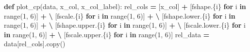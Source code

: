 \documentclass[
]{article}
\newenvironment{Shaded}{\begin{snugshade}}{\end{snugshade}}
\newcommand{\BuiltInTok}[1]{#1}
\newcommand{\ControlFlowTok}[1]{\textcolor[rgb]{0.13,0.29,0.53}{\textbf{#1}}}
\newcommand{\DecValTok}[1]{\textcolor[rgb]{0.00,0.00,0.81}{#1}}
\newcommand{\KeywordTok}[1]{\textcolor[rgb]{0.13,0.29,0.53}{\textbf{#1}}}
\newcommand{\NormalTok}[1]{#1}
\newcommand{\OperatorTok}[1]{\textcolor[rgb]{0.81,0.36,0.00}{\textbf{#1}}}
\newcommand{\SpecialCharTok}[1]{\textcolor[rgb]{0.00,0.00,0.00}{#1}}
\newcommand{\SpecialStringTok}[1]{\textcolor[rgb]{0.31,0.60,0.02}{#1}}
\theoremstyle{definition}
\theoremstyle{plain}
\theoremstyle{definition}
\theoremstyle{definition}
\theoremstyle{definition}
\theoremstyle{definition}
\theoremstyle{remark}
\begin{document}
\begin{Shaded}
\begin{Highlighting}[]
\KeywordTok{def}\NormalTok{ plot\_cp(data, x\_col, x\_col\_label):}
\NormalTok{  rel\_cols }\OperatorTok{=}\NormalTok{ [x\_col] }\OperatorTok{+}\NormalTok{ [}\SpecialStringTok{f\textquotesingle{}shape.}\SpecialCharTok{\{i\}}\SpecialStringTok{\textquotesingle{}} \ControlFlowTok{for}\NormalTok{ i }\KeywordTok{in} \BuiltInTok{range}\NormalTok{(}\DecValTok{1}\NormalTok{, }\DecValTok{6}\NormalTok{)] }\OperatorTok{+} \OperatorTok{\textbackslash{}}
\NormalTok{    [}\SpecialStringTok{f\textquotesingle{}scale.}\SpecialCharTok{\{i\}}\SpecialStringTok{\textquotesingle{}} \ControlFlowTok{for}\NormalTok{ i }\KeywordTok{in} \BuiltInTok{range}\NormalTok{(}\DecValTok{1}\NormalTok{, }\DecValTok{6}\NormalTok{)] }\OperatorTok{+} \OperatorTok{\textbackslash{}}
\NormalTok{    [}\SpecialStringTok{f\textquotesingle{}shape.lower.}\SpecialCharTok{\{i\}}\SpecialStringTok{\textquotesingle{}} \ControlFlowTok{for}\NormalTok{ i }\KeywordTok{in} \BuiltInTok{range}\NormalTok{(}\DecValTok{1}\NormalTok{, }\DecValTok{6}\NormalTok{)] }\OperatorTok{+} \OperatorTok{\textbackslash{}}
\NormalTok{    [}\SpecialStringTok{f\textquotesingle{}shape.upper.}\SpecialCharTok{\{i\}}\SpecialStringTok{\textquotesingle{}} \ControlFlowTok{for}\NormalTok{ i }\KeywordTok{in} \BuiltInTok{range}\NormalTok{(}\DecValTok{1}\NormalTok{, }\DecValTok{6}\NormalTok{)] }\OperatorTok{+} \OperatorTok{\textbackslash{}}
\NormalTok{    [}\SpecialStringTok{f\textquotesingle{}scale.lower.}\SpecialCharTok{\{i\}}\SpecialStringTok{\textquotesingle{}} \ControlFlowTok{for}\NormalTok{ i }\KeywordTok{in} \BuiltInTok{range}\NormalTok{(}\DecValTok{1}\NormalTok{, }\DecValTok{6}\NormalTok{)] }\OperatorTok{+} \OperatorTok{\textbackslash{}}
\NormalTok{    [}\SpecialStringTok{f\textquotesingle{}scale.upper.}\SpecialCharTok{\{i\}}\SpecialStringTok{\textquotesingle{}} \ControlFlowTok{for}\NormalTok{ i }\KeywordTok{in} \BuiltInTok{range}\NormalTok{(}\DecValTok{1}\NormalTok{, }\DecValTok{6}\NormalTok{)]}
\NormalTok{  rel\_data }\OperatorTok{=}\NormalTok{ data[rel\_cols].copy()}


\end{Highlighting}
\end{Shaded}
\end{document}
